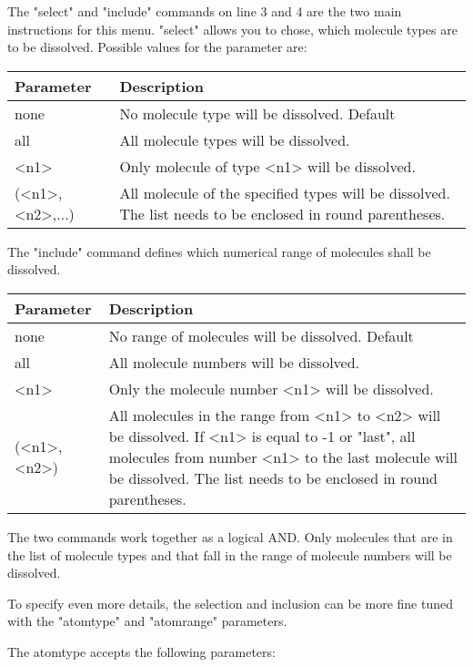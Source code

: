 The "select" and "include" commands on line 3 and 4 are the two main instructions
for this menu. "select" allows you to chose, which molecule types are to be 
dissolved. Possible values for the parameter are:

\begin{tabularx}{\textwidth}{|p{30mm}|X|}
  \hline
  {\bf Parameter} & {\bf Description} \\
  \hline\hline
  none    & No  molecule type  will be dissolved. Default\\
  all     & All molecule types will be dissolved.\\
  <n1>    & Only molecule of type <n1> will be dissolved.\\
  (<n1>,<n2>{,...})    & All  molecule of the specified types 
                         will be dissolved. The list needs to be enclosed in
                         round parentheses.\\
  \hline
\end{tabularx}

The "include" command defines which numerical range of molecules shall be 
dissolved. 

\begin{tabularx}{\textwidth}{|p{30mm}|X|}
  \hline
  {\bf Parameter} & {\bf Description} \\
  \hline\hline
  none    & No range of molecules will be dissolved. Default\\
  all     & All molecule numbers will be dissolved.\\
  <n1>    & Only the molecule number  <n1> will be dissolved.\\
  (<n1>,<n2>)    & All  molecules in the range from <n1> to <n2>
                         will be dissolved. If <n1> is equal to -1 or 
                         "last", all molecules from number <n1> to the 
                         last molecule will be dissolved. The list needs to be 
                         enclosed in round parentheses.\\
  \hline
\end{tabularx}

The two commands work together as a logical AND. Only molecules that are in the
list of molecule types and that fall in the range of molecule numbers will be
dissolved.

To specify even more details, the selection and inclusion can be more fine tuned
with the "atomtype" and "atomrange" parameters.

The atomtype accepts the following parameters:

